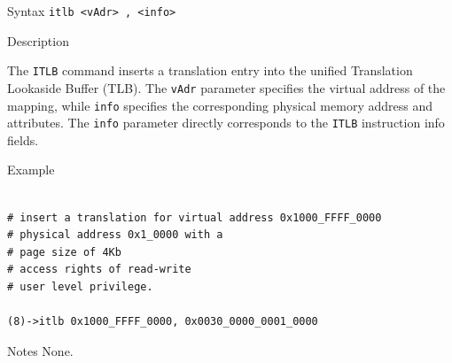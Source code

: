 %
%
\pagebreak
{}

\begin{iPageDescEntry}{Syntax}
\texttt{itlb <vAdr> , <info>}
\end{iPageDescEntry}

\begin{iPageDescEntry}{Description}

The \texttt{ITLB} command inserts a translation entry into the unified Translation Lookaside Buffer (TLB). The \texttt{vAdr} parameter specifies the virtual address of the mapping, while \texttt{info} specifies the corresponding physical memory address and attributes. The \texttt{info} parameter directly corresponds to the \texttt{ITLB} instruction info fields.

\end{iPageDescEntry}

\begin{iPageDescOpEntry}{Example}
\begin{lstlisting}[style=iPageOpStyle]

# insert a translation for virtual address 0x1000_FFFF_0000 
# physical address 0x1_0000 with a 
# page size of 4Kb
# access rights of read-write
# user level privilege.

(8)->itlb 0x1000_FFFF_0000, 0x0030_0000_0001_0000
\end{lstlisting}
\end{iPageDescOpEntry}

\begin{iPageDescEntry}{Notes}
None.
\end{iPageDescEntry}
